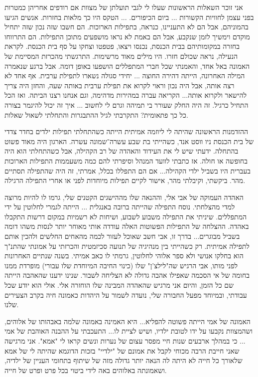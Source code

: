 \documentclass[14pt, article, extrafontsizes, twopage, a4paper]{memoir}
\begin{document}
אני זוכר השאלות הראשונות שעלו לי לגבי תועלתן של מצוות אם רודפים אחריהן כמטרות בפני עצמן לחוויות הקשורות ... ביום הכיפורים. ... הטקס היו כך מלאות בחזרות. אנשים הגיעו בהמוניהם, אבל הם לא התעניינו, כנראה, בתפילות הארוכות. הם חשבו שזה נכון שזה יתחיל מוקדם וימשיך לזמן שנקבע, אבל הם באמת לא נראו מושפעים מתוכן התפילות. הם התרווחו בחזרה במקומותיהם בבית הכנסת, נכנסו ויצאו, פטפטו וצחקו על סף בית הכנסת. לקראת הנעילה, נראה שכולם חזרו. היו מילים מאוד מרשימות. התרגשתי מהכרזת המסיימת של האמונה באל אחד, והאמנתי שכל חברי המתפללים הושפעו באופן דומה.
אבל ברגע שנאמרה המילה האחרונה, הייתה דהירה החוצה ... יחידי סגולה נשארו לתפילת ערבית. אף אחד לא רצה אותה, אבל היה נכון וראוי לקרוא את תפילת ערבית באותה שעה, והחזן היה צריך להישאר ולקרוא אותה... הקריאה עברה במהירות מדהימה, וגם אנחנו רצנו הביתה. ואז הכל התחיל כרגיל. זה היה החלק שעורר בי תמיהה וגרם לי לחשוב ... איך זה יכול להיגמר בצורה כל כך פתאומית? התקרבתי לגיל ההתבגרות והתחלתי לשאול שאלות.

ההזדמנות הראשונה שהיתה לי ליוזמה אמיתית הייתה כשהתחלתי תפילות ילדים בחדר צדדי של בית הכנסת ניו ווסט אנד, כשהייתי בת שבע עשרה־שמונה עשרה. הארגון היה מאוד פשוט בהתחלה. ידעתי שיש לי את העידוד והאהדה של רב הקהילה, אבל כשהתחלתי הוא היה בחופשה או חולה. אז כתבתי לוועד המנהל וסיפרתי להם כמה משעממות התפילות הארוכות בעברית היו בשביל ילדי הקהילה... אם הם התפללו בכלל, אמרתי, זה היה שהתפילה תסתיים מהר. ביקשתי, וקיבלתי מהר, אישור לקיים תפילות מיוחדות לפני או אחרי התפילה הרגילה.

האהדה העמוקה של אבי אלי, וההנאה שלו מההישגים הקטנים שלי, גרמו לו להיות מרוצה למדי מהצלחתי. נוסח התפילה שהייתה ברובה באנגלית ... הייתה לגמרי לחלוטין על ידי המתפללים. שיניתי את התפילה משבוע לשבוע, ושיחות לא רשמיות במקום דרשות התקבלו באהדה. ההצלחה של התפילות הפשוטות האלה עודדה אותי מאוחר יותר לנסות משהו דומה בשביל מבוגרים... בדרך זו, אבי חשב שאוכל לעזור לכמה מהאחים החלשים ולהכין אותם לתפילה אמיתית. רק כשהייתי בין מנהיגיה של תנועה סכיזמטית והכרזתי על אמונתי שהתנ"ך הוא בחלקו אנושי ולא ספר אלוהי לחלוטין, גרמתי לו כאב אמיתי. בשנה שנתיים האחרונות לפני מותו, אבי הרגיש שה"לילצ'ן" שלו (כינוי החיבה המיוחדת שלו עבורי) מופרדת ממנו בחומה של אי הסכמה שאפילו אהבה גדולה לא הצליחה לשבור. שנינו ידענו שהאהבה הייתה שם כל הזמן, והיום אני מרגיש שהאהדה המבינה שלו הוחזרה אלי. אולי הוא יודע שכל עבודתי, ובמיוחד מפעל החבורה שלי, נועדה לשמור על היהדות כאמונה חיה בקרב הצעירים שלנו.

האמונה של אמי הייתה פשוטה להפליא... היא האמינה באמונה שלמה באבהותו של אלוהים, ושהמצוות נקבעו על ידו לטובת ילדיו, ושיש לציית לו... התעכבתי על ההבנה האוהבת של אמי ... כי במהלך ארבעים שנות חיי מפסר עצום של נערות ונשים קראו לי "אמא". אני מרגישה שאני חייבת הרבה מכוחי לקבל את אמונם של "ילדיי" בזכות הדוגמא שהיתה לי של אמא שלאורך כל חייה לא היתה לה הנאה יותר גדולה מזה של שיתוף בתחומי העניין של ילדיה, ושאמונתה באלוהים באה לידי ביטוי בכל פרט ופרט של חייה.
\end{document}
